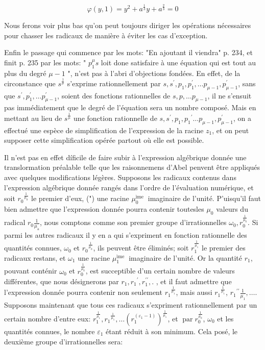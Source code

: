 \documentclass{article}
\begin{document}
\[
\varphi(y, 1)=y^{2}+a^{\frac{1}{3}} y+a^{\frac{2}{3}}=0
\]

Nous ferons voir plus bas qu'on peut toujours diriger les opérations nécessaires pour chasser les radicaux de manière à éviter les cas d'exception.

Enfin le passage qui commence par les mots: "En ajoutant il viendra" p. 234, et finit p. 235 par les mots: " \(p_{1}^{\mu} s\) loit done satisfaire à une équation qui est tout au plus du degré \(\mu-1\) ", n'est pas à l'abri d'objections fondées. En effet, de la circonstance que \(s^{\frac{1}{\mu}}\) s'exprime rationnellement par \(s, s^{\prime}, p_{1}, p_{1}^{\prime}, \ldots p_{\mu-1}, p_{\mu-1}^{\prime}\), sans que \(s^{\prime}, p_{1}^{\prime}, \ldots p_{\mu-1}^{\prime}\), soient des fonctions rationnelles de \(s, p, \ldots p_{\mu-1}\), il ne s'ensuit pas immédiatement que le degré de l'équation sera un nombre composé. Mais en mettant au lieu de \(s^{\frac{1}{\mu}}\) une fonction rationnelle de \(s, s^{\prime}, p_{1}, p_{1}{ }^{\prime} \ldots p_{\mu-1}, p_{\mu-1}^{\prime}\), on a effectué une espèce de simplification de l'expression de la racine \(z_{1}\), et on peut supposer cette simplification opérée partout où elle est possible.

Il n'est pas en effet díficile de faire subir à l'expression algébrique donnée une translormation préalable telle que les raisonnemens d'Abel penvent être appliqués avec
quelques modifications légères. Supposons les radicaux contenus dans l'expression algébrique donnée rangés dans l'ordre de l'évaluation numérique, et soit \(r_{0}{ }^{\frac{1}{\mu_{0}}}\) le premier d'eux, (") une racine \(\mu_{0}^{\text {ìme }}\) imaginaire de l'unité. P'uisqu'il faut bien admettre que l'expression donnée pourra contenir toutesles \(\mu_{0}\) valeurs du radical \(r_{0} \frac{1}{\mu_{\mathrm{a}}}\), nous comptons comme son premier groupe d'irrationnelles \(\omega_{0}, r_{0}^{\frac{1}{\mu_{0}}}\). Si parmi les autres radicaux il y en a qui s'expriment en fonction rationnelle des quantités connues, \(\omega_{0}\) et \(r_{0}{ }^{\frac{1}{\mu_{0}}}\), ils peuvent être éliminés; soit \(r_{1}^{\frac{1}{\mu_{1}}}\) le premier des radicaux restans, et \(\omega_{1}\) une racine \(\mu_{1}^{\text {ìme }}\) imaginaire de l'unité. Or la quantité \(r_{1}\), pouvant conténir \(\omega_{0}\) et \(r_{0}^{\frac{1}{\mu_{0}}}\), est succeptible d'un certain nombre de valeurs différentes, que nous désignerons par \(r_{1}, r_{1}{ }^{\prime}, r_{1}^{\prime \prime},\). , et il faut admettre que l'expression donnée pourra contenir non seulement \(r_{1}{ }^{\frac{1}{\mu_{1}}}\), mais aussi \(r_{1}{ }^{\frac{1}{\mu_{1}}}\), \(r_{1}{ }^{\prime \prime} \frac{1}{\mu_{1}}, \ldots\). Supposons maintenant que tous ces radicaux s'expriment rationnellement par un certain nombre d'entre eux: \(r_{1}^{\frac{1}{\mu_{1}}}, r_{1}{ }^{\frac{1}{\mu_{1}}}, \ldots\left(r_{1}^{\left(\varepsilon_{1}-1\right)}\right)^{\frac{1}{\mu_{1}}}\), et \(\operatorname{par} r_{0}^{\frac{1}{\mu_{0}}}\), \(\omega_{0}\) et les quantités connues, le nombre \(\varepsilon_{1}\) étant réduit à son minimum. Cela posé, le deuxième groupe d'irrationnelles sera:
\end{document}
